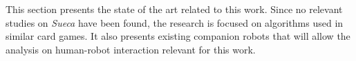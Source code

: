 \label{sec:related-work}

This section presents the state of the art related to this work.
Since no relevant studies on \emph{Sueca} have been found, the research is focused on algorithms used in similar card games.
It also presents existing companion robots that will allow the analysis on human-robot interaction relevant for this work.



